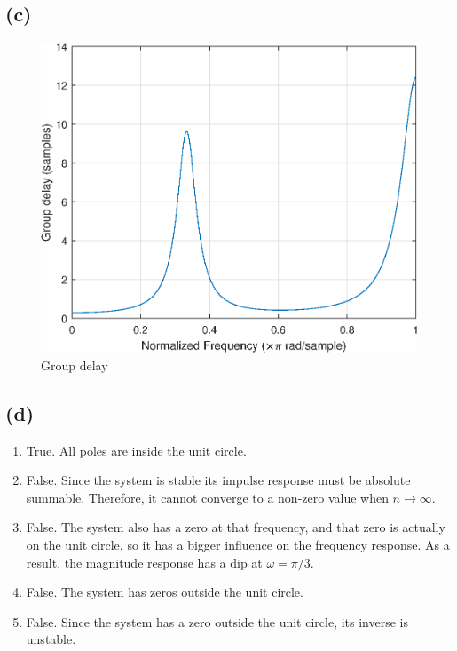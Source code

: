 \documentclass{article}
\begin{document}
\subsection{(c)}

\FloatBarrier
\begin{figure}[h!]
	\centering
	\includegraphics[scale=0.7]{figs/hw4q1b_grpdelay.eps}
	\caption{Group delay}
\end{figure}
\FloatBarrier

\subsection{(d)}

\begin{enumerate}
	\item True. All poles are inside the unit circle.
	\item False. Since the system is stable its impulse response must be absolute summable. Therefore, it cannot converge to a non-zero value when $n\to\infty$.
	\item False. The system also has a zero at that frequency, and that zero is actually on the unit circle, so it has a bigger influence on the frequency response. As a result, the magnitude response has a dip at $\omega = \pi/3$.
	\item False. The system has zeros outside the unit circle.
	\item False. Since the system has a zero outside the unit circle, its inverse is unstable.
\end{enumerate}
\end{document}
